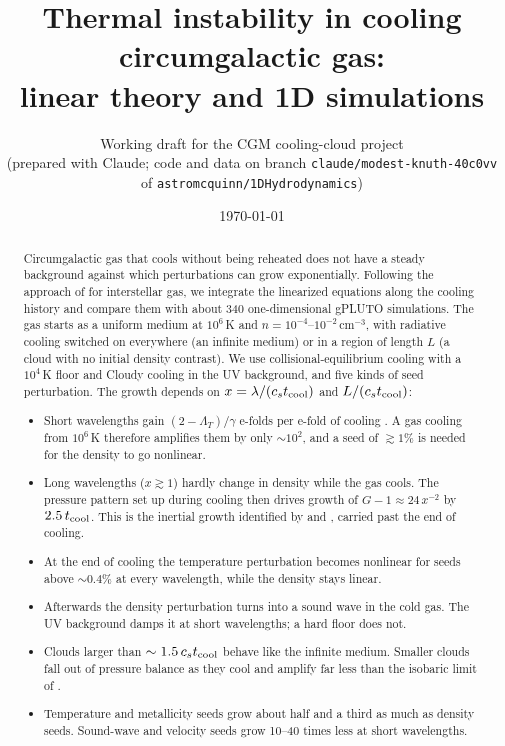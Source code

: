 \documentclass[11pt]{article}
\title{Thermal instability in cooling circumgalactic gas:\\ linear theory and 1D simulations}
\author{Working draft for the CGM cooling-cloud project\\
\small (prepared with Claude; code and data on branch \texttt{claude/modest-knuth-40c0vv} of \texttt{astromcquinn/1DHydrodynamics})}
\date{\today}
\newcommand{\tcool}{t_{\rm cool}}
\newcommand{\cstc}{c_s t_{\rm cool}}
\newcommand{\LT}{\Lambda_T}
\begin{document}
\maketitle

\begin{abstract}
Circumgalactic gas that cools without being reheated does not have a steady
background against which perturbations can grow exponentially. Following the
approach of \citet{schwarz72} for interstellar gas, we integrate the linearized
equations along the cooling history and compare them with about 340
one-dimensional gPLUTO simulations. The gas starts as a uniform medium at
$10^6$\,K and $n=10^{-4}$--$10^{-2}$\,cm$^{-3}$, with radiative cooling switched on
everywhere (an infinite medium) or in a region of length $L$ (a cloud with no
initial density contrast). We use collisional-equilibrium cooling with a $10^4$\,K
floor and Cloudy cooling in the \citet{hm12} UV background, and five kinds of seed
perturbation. The growth depends on $x=\lambda/(\cstc)$ and $L/(\cstc)$:
\begin{itemize}
\item Short wavelengths gain $(2-\LT)/\gamma$ e-folds per e-fold of cooling
  \citep{schwarz72,balbus86,burkert00}. A gas cooling from $10^6$\,K therefore
  amplifies them by only $\sim10^2$, and a seed of $\gtrsim1\%$ is needed for the
  density to go nonlinear.
\item Long wavelengths ($x\gtrsim1$) hardly change in density while the gas cools.
  The pressure pattern set up during cooling then drives growth of
  $G-1\approx24\,x^{-2}$ by $2.5\,\tcool$. This is the inertial growth identified by
  \citet{schwarz72} and \citet{burkert00}, carried past the end of cooling.
\item At the end of cooling the temperature perturbation becomes nonlinear for
  seeds above $\sim0.4\%$ at every wavelength, while the density stays linear.
\item Afterwards the density perturbation turns into a sound wave in the cold gas.
  The UV background damps it at short wavelengths; a hard floor does not.
\item Clouds larger than $\sim1.5\,\cstc$ behave like the infinite medium. Smaller
  clouds fall out of pressure balance as they cool and amplify far less than the
  isobaric limit of \citet{mathews78}.
\item Temperature and metallicity seeds grow about half and a third as much as density
  seeds. Sound-wave and velocity seeds grow 10--40 times less at short wavelengths.
\end{itemize}
\end{abstract}
\end{document}
